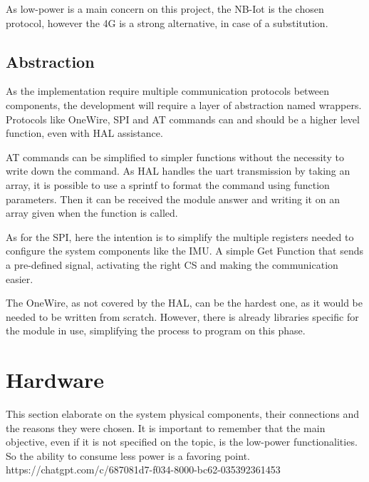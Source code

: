 As low-power is a main concern on this project, the NB-Iot is the chosen protocol, 
however the 4G is a strong alternative, in case of a substitution.
\subsection{Abstraction}

As the implementation require multiple communication protocols between components,
the development will require a layer of abstraction named wrappers. Protocols like OneWire, SPI and AT 
commands can and should be a higher level function, even with HAL assistance.

AT commands can be simplified to simpler functions without the necessity to write down
the command. As HAL handles the \acrshort{uart} transmission by taking an array, it is possible to
use a sprintf to format the command using function parameters. Then it can be received 
the module answer and writing it on an array given when the function is called. 

As for the SPI, here the intention is to simplify the multiple registers needed to 
configure the system components like the IMU. A simple Get Function that sends a 
pre-defined signal, activating the right CS and making the communication easier.

The OneWire, as not covered by the HAL, can be the hardest one, as it would be needed
to be written from scratch. However, there is already libraries specific for the 
module in use, simplifying the process to program on this phase. 


\section{Hardware}

This section elaborate on the system physical components, their connections and the 
reasons they were chosen. It is important to remember that the main objective, even if 
it is not specified on the topic, is the low-power functionalities. So the ability to
consume less power is a favoring point. 
https://chatgpt.com/c/687081d7-f034-8000-bc62-035392361453

